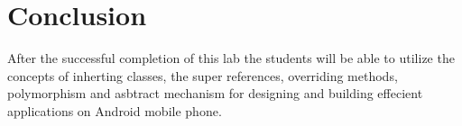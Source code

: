 \section{Conclusion}

After the successful completion of this lab the students will be able to utilize the concepts of inherting classes, the super references, overriding methods, polymorphism and asbtract mechanism for designing and building effecient applications on Android mobile phone.
